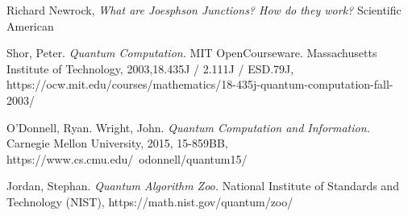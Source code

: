 \documentclass[a4paper]{article}
\begin{document}
\begin{thebibliography}{9}
	
	





	Richard Newrock,
	\emph{What are Joesphson Junctions? How do they work?}
	Scientific American
	

	Shor, Peter. \emph{Quantum Computation.} MIT OpenCourseware. Massachusetts Institute of Technology, 2003,18.435J / 2.111J / ESD.79J, \newline https://ocw.mit.edu/courses/mathematics/18-435j-quantum-computation-fall-2003/

	O'Donnell, Ryan. Wright, John. \emph{Quantum Computation and Information.} Carnegie Mellon University, 2015, 15-859BB, \newline https://www.cs.cmu.edu/~odonnell/quantum15/

	Jordan, Stephan. \emph{Quantum Algorithm Zoo.} National Institute of Standards and Technology (NIST),  https://math.nist.gov/quantum/zoo/
	






\begin{comment}


\end{comment}
\end{thebibliography}
\end{document}
